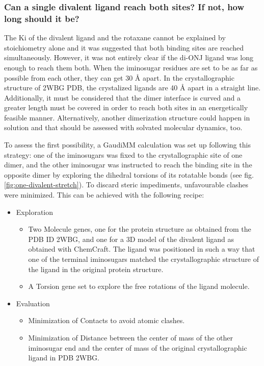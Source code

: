\subsubsection{Can a single divalent ligand reach both sites? If not, how long should it be?}
\label{section:di-ONJ-stretch}
The Ki of the divalent ligand and the rotaxane cannot be explained by stoichiometry alone and it was suggested that both binding sites are reached simultaneously. However, it was not entirely clear if the di-ONJ ligand was long enough to reach them both. When the iminosugar residues are set to be as far as possible from each other, they can get 30 Å apart. In the crystallographic structure of 2WBG PDB, the crystalized ligands are 40 Å apart in a straight line. Additionally, it must be considered that the dimer interface is curved and a greater length must be covered in order to reach both sites in an energetically feasible manner. Alternatively, another dimerization structure could happen in solution and that should be assessed with solvated molecular dynamics, too.

To assess the first possibility, a GaudiMM calculation was set up following this strategy: one of the iminosugars was fixed to the crystallographic site of one dimer, and the other iminosugar was instructed to reach the binding site in the opposite dimer by exploring the dihedral torsions of its rotatable bonds (see fig. \ref{fig:one-divalent-stretch}). To discard steric impediments, unfavourable clashes were minimized. This can be achieved with the following recipe:

\begin{itemize}
	\item Exploration

\begin{itemize}
	\item Two Molecule genes, one for the protein structure as obtained from the PDB ID 2WBG, and one for a 3D model of the divalent ligand as obtained with ChemCraft. The ligand was positioned in such a way that one of the terminal iminosugars matched the crystallographic structure of the ligand in the original protein structure.

	\item A Torsion gene set to explore the free rotations of the ligand molecule.


\end{itemize}
	\item Evaluation

\begin{itemize}
	\item Minimization of Contacts to avoid atomic clashes.

	\item Minimization of Distance between the center of mass of the other iminosugar end and the center of mass of the original crystallographic ligand in PDB 2WBG.
\end{itemize}
\end{itemize}





